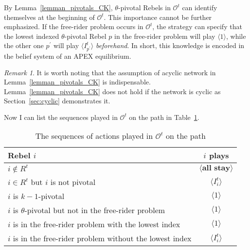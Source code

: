 \documentclass[12pt,letter]{article}
\newcommand{\Omicron}{\mathcal{O}}
\theoremstyle{definition}
\theoremstyle{remark}
\newtheorem*{remark}{Remark}
\theoremstyle{claim}
\begin{document}
By Lemma~\ref{lemman_pivotals_CK}, $\theta$-pivotal Rebels in $\Omicron^t$ can identify themselves at the beginning of $\Omicron^t$. This importance cannot be further emphasized. If the free-rider problem occurs in $\Omicron^t$, the strategy can specify that the lowest indexed $\theta$-pivotal Rebel $p$ in the free-rider problem will play $\langle 1 \rangle$, while the other one $p^{'}$ will play $\langle I^t_{p^{'}} \rangle$ \textit{beforehand}. In short, this knowledge is encoded in the belief system of an APEX equilibrium. 

\begin{remark}
It is worth noting that the assumption of acyclic network in Lemma~\ref{lemman_pivotals_CK} is indispensable. Lemma~\ref{lemman_pivotals_CK} does not hold if the network is cyclic as Section~\ref{sec:cyclic} demonstrates it.
\end{remark}

Now I can list the sequences played in $\Omicron^t$ on the path in Table~\ref{Table_msg_RP_path}.

\begin{table}[!htbp]
\caption{The sequences of actions played in $\Omicron^t$ on the path}
\label{Table_msg_RP_path}
\begin{center}
\begin{tabular}{l c}
Rebel $i$ & $i$ plays\\
\hline
\hline
$i\notin R^t$				& $\langle \textbf{all stay} \rangle$  \\
$i\in R^t$ but $i$ is not pivotal	 					 			& $\langle I^t_i \rangle$  \\
$i$ is $k-1$-pivotal	 					 			& $\langle 1 \rangle$  \\
$i$ is $\theta$-pivotal but not in the free-rider problem	 					 			& $\langle 1 \rangle$  \\
$i$ is in the free-rider problem with the lowest index	 					 			& $\langle 1 \rangle$  \\
$i$ is in the free-rider problem without the lowest index	 					 			& $\langle I^t_i \rangle$  \\
\hline
\end{tabular}
\end{center}
\end{table}
\end{document}
